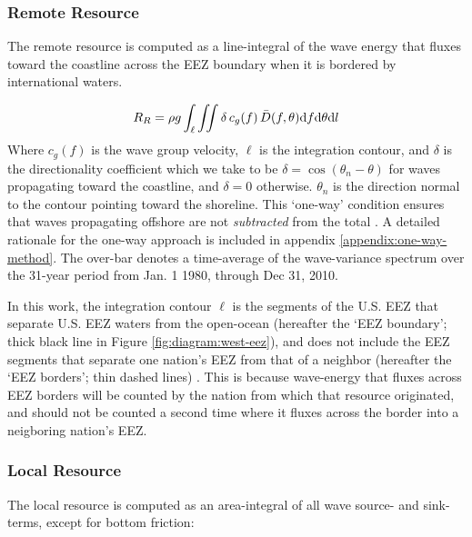 \subsubsection{Remote Resource} \label{sec:method:calc:remote}

The remote resource is computed as a line-integral of the wave energy that fluxes toward the coastline across the EEZ boundary when it is bordered by international waters. 

\begin{align}
  R_R = \rho g \int_{\ell}\iint \delta \, c_g(f) \, \bar{D}(f,\theta) \mathrm{d} f \mathrm{d} \theta \mathrm{d} l
\label{eqn:RR}
\end{align}
Where $c_g(f)$ is the wave group velocity, $\ell$ is the integration contour, and $\delta$ is the directionality coefficient which we take to be $\delta = \cos(\theta_n - \theta)$ for waves propagating toward the coastline, and $\delta = 0$ otherwise. 
$\theta_n$ is the direction normal to the contour pointing toward the shoreline. 
This `one-way' condition ensures that waves propagating offshore are not {\em subtracted} from the total \citep[]{gunnQuantifyingGlobalWave2012}. A detailed rationale for the one-way approach is included in appendix \ref{appendix:one-way-method}. The over-bar denotes a time-average of the wave-variance spectrum over the 31-year period from Jan. 1 1980, through Dec 31, 2010.

In this work, the integration contour $\ell$ is the segments of the U.S. EEZ that separate U.S. EEZ waters from the open-ocean (hereafter the `EEZ boundary'; thick black line in Figure \ref{fig:diagram:west-eez}), and does not include the EEZ segments that separate one nation's EEZ from that of a neighbor (hereafter the `EEZ borders'; thin dashed lines) \citep[]{flandersmarineinstituteMaritimeBoundariesGeodatabase2018}. This is because wave-energy that fluxes across EEZ borders will be counted by the nation from which that resource originated, and should not be counted a second time where it fluxes across the border into a neigboring nation's EEZ.


\subsubsection{Local Resource} \label{sec:method:calc:local}

The local resource is computed as an area-integral of all wave source- and sink-terms, except for bottom friction:

